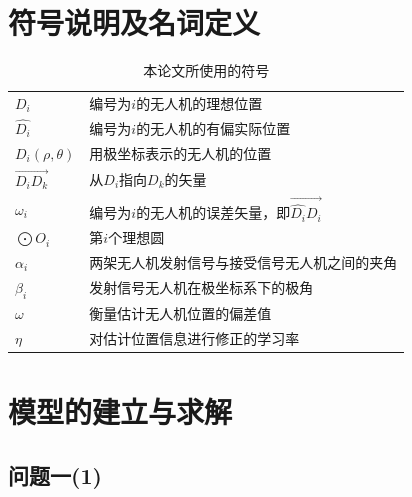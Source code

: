 \documentclass[withoutpreface,bwprint]{cumcmthesis} %
\begin{document}
	\section{符号说明及名词定义}
		\begin{center}
			\begin{table}[H]
				\caption{本论文所使用的符号}
				\begin{tabularx}{\textwidth}{p{0.08\textwidth}X}
					\toprule	
					$D_i$ & 编号为$i$的无人机的理想位置  \\
					$\widehat{D_i}$ & 编号为$i$的无人机的有偏实际位置  \\
					$D_i(\rho,\theta)$ & 用极坐标表示的无人机的位置 \\
					  
					$\overrightarrow{D_iD_k}$ & 从$D_i$指向$D_k$的矢量 \\
					$\omega_i$      & 编号为$i$的无人机的误差矢量，即$\overrightarrow{\widehat{D_i}D_i}$ \\
					$\bigodot O_i$    & 第$i$个理想圆  \\
					$ \alpha_i $	&两架无人机发射信号与接受信号无人机之间的夹角\\
					$ \beta_i $	    &发射信号无人机在极坐标系下的极角\\
					$ \omega$ 		&衡量估计无人机位置的偏差值\\
					$ \eta $		&对估计位置信息进行修正的学习率\\
					\bottomrule
				\end{tabularx}
			\end{table}

		\end{center}
	\section{模型的建立与求解}
		\subsection{问题一(1)}
\end{document}
